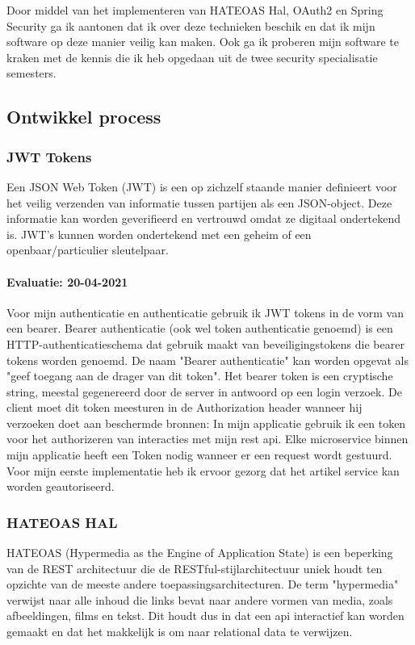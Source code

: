 Door middel van het implementeren van HATEOAS Hal, OAuth2 en Spring Security ga ik aantonen dat ik over deze
technieken beschik en dat ik mijn software op deze manier veilig kan maken.
Ook ga ik proberen mijn software te kraken met de kennis die ik heb opgedaan uit de twee security specialisatie
semesters.


\subsection{Ontwikkel process}
\subsubsection{JWT Tokens}
Een JSON Web Token (JWT) is een op zichzelf staande manier definieert voor het veilig verzenden van informatie tussen partijen als een JSON-object.
Deze informatie kan worden geverifieerd en vertrouwd omdat ze digitaal ondertekend is.
JWT's kunnen worden ondertekend met een geheim of een openbaar/particulier sleutelpaar.
\paragraph{Evaluatie: 20-04-2021}
Voor mijn authenticatie en authenticatie gebruik ik JWT tokens in de vorm van een bearer.
Bearer authenticatie (ook wel token authenticatie genoemd) is een HTTP-authenticatieschema dat gebruik maakt van beveiligingstokens die bearer tokens worden genoemd.
De naam "Bearer authenticatie" kan worden opgevat als "geef toegang aan de drager van dit token".
Het bearer token is een cryptische string, meestal gegenereerd door de server in antwoord op een login verzoek.
De client moet dit token meesturen in de Authorization header wanneer hij verzoeken doet aan beschermde bronnen:
In mijn applicatie gebruik ik een token voor het authorizeren van interacties met mijn rest api.
Elke microservice binnen mijn applicatie heeft een Token nodig wanneer er een request wordt gestuurd.
Voor mijn eerste implementatie heb ik ervoor gezorg dat het artikel service kan worden geautoriseerd.


\subsubsection{HATEOAS HAL}
HATEOAS (Hypermedia as the Engine of Application State) is een beperking van de REST architectuur die de RESTful-stijlarchitectuur uniek houdt ten opzichte van de meeste andere toepassingsarchitecturen.
De term "hypermedia" verwijst naar alle inhoud die links bevat naar andere vormen van media, zoals afbeeldingen, films en tekst.
Dit houdt dus in dat een api interactief kan worden gemaakt en dat het makkelijk is om naar relational data te verwijzen.
